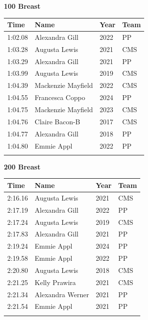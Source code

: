 \vspace{1.2em}
\noindent\begin{minipage}[t]{0.98\textwidth}
\centering
\textbf{\textcolor{teamprimary}{100 Breast}}\par
\vspace{0.5em}
\centering
\small
\renewcommand{\arraystretch}{1.0}
\setlength{\tabcolsep}{4pt}
\begin{tabular}{@{}p{2.5cm}p{4.5cm}p{1.5cm}p{2.5cm}@{}}
\toprule
\textbf{Time} & \textbf{Name} & \textbf{Year} & \textbf{Team} \\
\midrule
1:02.08 & Alexandra Gill & 2022 & PP \\
1:03.28 & Augusta Lewis & 2021 & CMS \\
1:03.29 & Alexandra Gill & 2021 & PP \\
1:03.99 & Augusta Lewis & 2019 & CMS \\
1:04.39 & Mackenzie Mayfield & 2022 & CMS \\
1:04.55 & Francesca Coppo & 2024 & PP \\
1:04.75 & Mackenzie Mayfield & 2023 & CMS \\
1:04.76 & Claire Bacon-B & 2017 & CMS \\
1:04.77 & Alexandra Gill & 2018 & PP \\
1:04.80 & Emmie Appl & 2022 & PP \\
\bottomrule
\vspace{0.5em}
\end{tabular}
\end{minipage}
\vspace{1.2em}
\noindent\begin{minipage}[t]{0.98\textwidth}
\centering
\textbf{\textcolor{teamprimary}{200 Breast}}\par
\vspace{0.5em}
\centering
\small
\renewcommand{\arraystretch}{1.0}
\setlength{\tabcolsep}{4pt}
\begin{tabular}{@{}p{2.5cm}p{4.5cm}p{1.5cm}p{2.5cm}@{}}
\toprule
\textbf{Time} & \textbf{Name} & \textbf{Year} & \textbf{Team} \\
\midrule
2:16.16 & Augusta Lewis & 2021 & CMS \\
2:17.19 & Alexandra Gill & 2022 & PP \\
2:17.24 & Augusta Lewis & 2019 & CMS \\
2:17.83 & Alexandra Gill & 2021 & PP \\
2:19.24 & Emmie Appl & 2024 & PP \\
2:19.58 & Emmie Appl & 2022 & PP \\
2:20.80 & Augusta Lewis & 2018 & CMS \\
2:21.25 & Kelly Prawira & 2021 & CMS \\
2:21.34 & Alexandra Werner & 2021 & PP \\
2:21.54 & Emmie Appl & 2021 & PP \\
\bottomrule
\vspace{0.5em}
\end{tabular}
\end{minipage}
